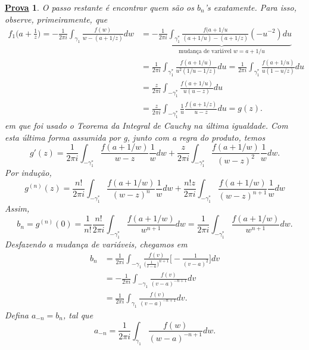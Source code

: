 \documentclass{article}
\newtheorem*{proof*}{\underline{Prova}}
\begin{document}
\begin{proof*}
    O passo restante é encontrar quem são os \(b_{n}\)'s exatamente. Para isso, observe, primeiramente, que 
    \begin{align*}
      f_{1}\biggl(a + \frac{1}{z}\biggr) = -\frac{1}{2\pi i}\int_{\gamma _{1}}^{}\frac{f(w)}{w-(a+1/z)}dw &= \underbrace{-\frac{1}{2\pi i}\int_{\gamma_{1}^{*}}^{}\frac{f(a+1/u}{(a+1/u)-(a+1/z)}(-u^{-2})du}_{\text{mudança de variável } w = a + 1/u}\\
                                                                                                          &= \frac{1}{2\pi i}\int_{\gamma_{1}^{*}}^{}\frac{f(a+1/u)}{u^{2}(1/u-1/z)}du = \frac{1}{2\pi i}\int_{\gamma _{1}^{*}}^{}\frac{f(a+1/u)}{u(1-u/z)}du\\
                                                                                                          &= \frac{z}{2\pi i}\int_{-\gamma _{1}^{*}}^{}\frac{f(a+1/u)}{u(u-z)}du\\
                                                                                                          &= \frac{z}{2\pi i}\int_{-\gamma _{1}^{*}}^{}\frac{1}{u}\frac{f(a+1/z)}{u-z}du = g(z).
    \end{align*}
    em que foi usado o Teorema da Integral de Cauchy na última igualdade. Com esta última forma assumida por g, junto com a regra do produto, temos 
    \[
      g'(z) = \frac{1}{2\pi i}\int_{-\gamma _{1}^{*}}^{}\frac{f(a+1/w)}{w-z}\frac{1}{w}dw + \frac{z}{2\pi i}\int_{-\gamma _{1}^{*}}^{}\frac{f(a+1/w)}{(w-z)^{2}}\frac{1}{w}dw.
    \]
    Por indução,
    \[
      g^{(n)}(z) = \frac{n!}{2\pi i}\int_{-\gamma _{1}^{*}}^{}\frac{f(a+1/w)}{(w-z)^{n}}\frac{1}{w}dw + \frac{n!z}{2\pi i}\int_{-\gamma _{1}^{*}}^{}\frac{f(a+1/w)}{(w-z)^{n+1}}\frac{1}{w}dw
    \]
    Assim, 
    \[
      b_{n} = g^{(n)}(0) = \frac{1}{n!}\frac{n!}{2\pi i}\int_{-\gamma _{1}^{*}}^{}\frac{f(a+1/w)}{w^{n+1}}dw = \frac{1}{2\pi i}\int_{-\gamma _{1}^{*}}^{}\frac{f(a+1/w)}{w^{n+1}}dw.
    \]
    Desfazendo a mudança de variáveis, chegamos em
    \begin{align*}
      b_{n} &= \frac{1}{2\pi i}\int_{-\gamma _{1}}^{}\frac{f(v)}{\biggl(\frac{1}{v-a}\biggr)^{n+1}}\biggl[-\frac{1}{(v-a)^{2}}\biggr]dv\\
            &= -\frac{1}{2\pi i}\int_{-\gamma _{1}}^{}\frac{f(v)}{(v-a)^{-n+1}}dv\\
            &= \frac{1}{2\pi i}\int_{\gamma _{1}}^{}\frac{f(v)}{(v-a)^{-n+1}}dv.
    \end{align*}
    Defina \(a_{-n}=b_{n}\), tal que 
    \[
      a_{-n} = \frac{1}{2\pi i}\int_{\gamma _{1}}^{}\frac{f(w)}{(w-a)^{-n+1}}dw.
\]
\end{proof*}
\end{document}
